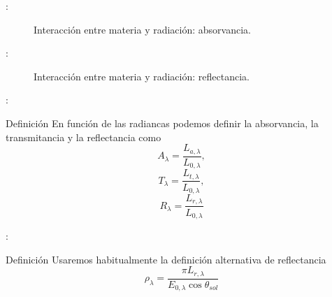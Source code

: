 \begin{frame}{\secname : \subsecname}
  \begin{figure}
    \centering
    \caption{Interacción entre materia y radiación: absorvancia.}
    \label{}
  \end{figure}
\end{frame}

\begin{frame}{\secname : \subsecname}
  \begin{figure}
    \centering
    \caption{Interacción entre materia y radiación: reflectancia.}
    \label{}
  \end{figure}
\end{frame}

\begin{frame}{\secname : \subsecname}
    \begin{block}{Definición}
        En función de las radiancas podemos definir la absorvancia, la transmitancia y la reflectancia como
        \begin{equation}
          A_\lambda = \frac{L_{a,\lambda}}{L_{0,\lambda}} ,
        \end{equation}
        \begin{equation}
          T_\lambda = \frac{L_{t,\lambda}}{L_{0,\lambda}} ,
        \end{equation}
        \begin{equation}
          R_\lambda = \frac{L_{r,\lambda}}{L_{0,\lambda}}
        \end{equation}
    \end{block}
\end{frame}

\begin{frame}{\secname : \subsecname}
    \begin{block}{Definición}
        Usaremos habitualmente la definición alternativa de reflectancia
        \begin{equation}
          \rho_\lambda = \frac{\pi L_{r,\lambda}}{E_{0,\lambda} \cos \theta_{sol}}
        \end{equation}
    \end{block}
\end{frame}

